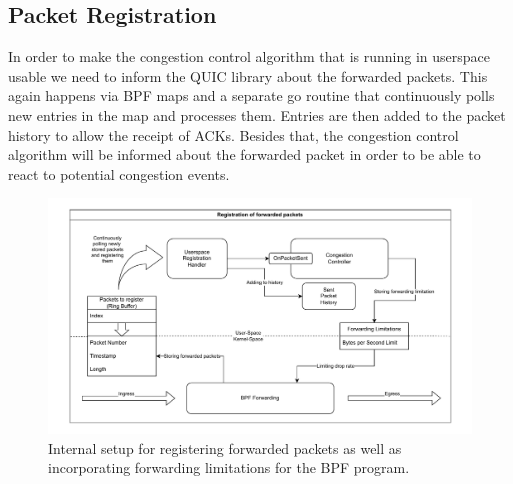 \subsection{Packet Registration}
In order to make the congestion control algorithm that is running in userspace
usable we need to inform the QUIC library about the forwarded packets.
This again happens via BPF maps and a separate go routine that continuously
polls new entries in the map and processes them.
Entries are then added to the packet history to allow the receipt of ACKs.
Besides that, the congestion control algorithm will be informed about the
forwarded packet in order to be able to react to potential congestion events.
\begin{figure}[htbp]
    \centering
    \includegraphics[width=\textwidth]{figures/03_fast_relays/forward-registration.drawio.pdf}
    \caption{Internal setup for registering forwarded packets as well as incorporating forwarding
    limitations for the BPF program.}\label{fig:forward-registration}
\end{figure}